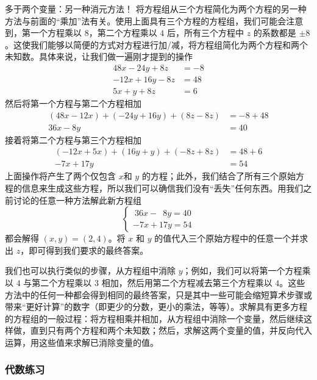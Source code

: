 \begin{method}{多于两个变量：另一种消元方法！}
    将方程组从三个方程简化为两个方程的另一种方法与前面的“乘加”法有关。使用上面具有三个方程的方程组，我们可能会注意到，第一个方程乘以 $8$，第二个方程乘以 $4$ 后，所有三个方程中 $z$ 的系数都是 $\pm 8$。这使我们能够以简便的方式对方程进行加/减，将方程组简化为两个方程和两个未知数。具体来说，让我们做一遍刚才提到的操作
    \begin{align*}
        48x - 24y + 8z &= -8 \\
        -12x + 16y - 8z &= 48 \\
        5x + y + 8z &= 6
    \end{align*}
    然后将第一个方程与第二个方程相加
    \begin{align*}
        (48x - 12x) + (-24y + 16y) + (8z - 8z) &= -8 + 48 \\
        36x - 8y &= 40
    \end{align*}
    接着将第二个方程与第三个方程相加
    \begin{align*}
        (-12x + 5x) + (16y + y) + (-8z + 8z) &= 48 + 6 \\
        -7x + 17y &= 54
    \end{align*}
    上面操作将产生了两个仅包含 $x$和 $y$ 的方程；此外，我们结合了所有三个原始方程的信息来生成这些方程，所以我们可以确信我们没有“丢失”任何东西。用我们之前讨论的任意一种方法解此新方程组
    $$
    \begin{cases}
        \: 36x - \enspace 8y = 40 \\
        -7x + 17y = 54  
    \end{cases}
    $$
    都会解得 $(x, y) = (2, 4)$。将 $x$ 和 $y$ 的值代入三个原始方程中的任意一个并求出 $z$，即可得到我们要求的最终答案。

    我们也可以执行类似的步骤，从方程组中消除 $y$；例如，我们可以将第一个方程乘以 $4$ 与第二个方程乘以 $3$ 相加，然后用第二个方程减去第三个方程乘以 $4$。这些方法中的任何一种都会得到相同的最终答案，只是其中一些可能会缩短算术步骤或带来“更好计算”的数字（即更少的分数，更小的乘法，等等）。求解具有更多方程的方程组的一般过程：将方程相乘并相加，从方程组中消除一个变量，然后继续这样做，直到只有两个方程和两个未知数；然后，求解这两个变量的值，并反向代入运算，用这些值来求解已消除变量的值。
\end{method}

\subsubsection*{代数练习}

